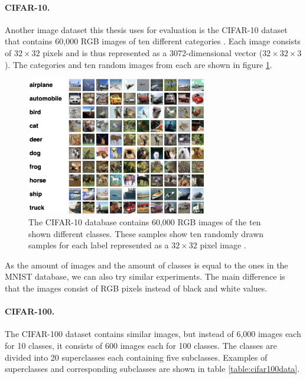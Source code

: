 \paragraph{CIFAR-10.} Another image dataset this thesis uses for evaluation is the CIFAR-10 dataset that contains 60,000 RGB images of ten different categories \cite{Krizhevsky2009LearningML}. Each image consists of $32 \times 32$ pixels and is thus represented as a 3072-dimensional vector ($32 \times 32 \times 3$). The categories and ten random images from each are shown in figure \ref{fig:cifar10}.

\begin{figure}[h]
    \centering
    \includegraphics[width=0.7\textwidth]{images/cifar10}
    \caption{The CIFAR-10 database contains 60,000 RGB images of the ten shown different classes. These samples show ten randomly drawn samples for each label represented as a $32 \times 32$ pixel image \cite{Krizhevsky2009LearningML}.}
    \label{fig:cifar10}
\end{figure}

As the amount of images and the amount of classes is equal to the ones in the MNIST database, we can also try similar experiments. The main difference is that the images consist of RGB pixels instead of black and white values.

\paragraph{CIFAR-100.} The CIFAR-100 dataset contains similar images, but instead of 6,000 images each for 10 classes, it consists of 600 images each for 100 classes. The classes are divided into 20 superclasses each containing five subclasses. Examples of superclasses and corresponding subclasses are shown in table \ref{table:cifar100data}. 

